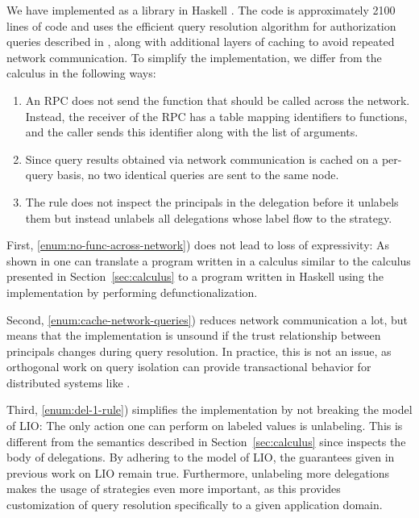 We have implemented \lang{} as a library in Haskell \cite{flamiolib}. The code is approximately 2100 lines of code and uses the efficient query resolution algorithm for authorization queries described in \cite{Arden:2015:FA:2859845.2859998}, along with additional layers of caching to avoid repeated network communication. To simplify the implementation, we differ from the calculus in the following ways:
\begin{enumerate}
    \item \label{enum:no-func-across-network} An RPC does not send the function that should be called across the network. Instead, the receiver of the RPC has a table mapping identifiers to functions, and the caller sends this identifier along with the list of arguments.
    \item \label{enum:cache-network-queries} Since query results obtained via network communication is cached on a per-query basis, no two identical queries are sent to the same node.
    \item \label{enum:del-1-rule} The  rule does not inspect the principals in the delegation before it unlabels them but instead unlabels all delegations whose label flow to the strategy.
\end{enumerate}

First, \ref{enum:no-func-across-network}) does not lead to loss of expressivity: As shown in \cite{Cooper:2009:RC:1599410.1599439} one can translate a program written in a calculus similar to the calculus presented in Section~\ref{sec:calculus} to a program written in Haskell using the \lang{} implementation by performing defunctionalization.

Second, \ref{enum:cache-network-queries}) reduces network communication a lot, but means that the implementation is unsound if the trust relationship between principals changes during query resolution. In practice, this is not an issue, as orthogonal work on query isolation \cite{Liu:2009:FPS:1629575.1629606} can provide transactional behavior for distributed systems like \lang.

Third, \ref{enum:del-1-rule}) simplifies the implementation by not breaking the model of LIO: The only action one can perform on labeled values is unlabeling. This is different from the semantics described in Section~\ref{sec:calculus} since  inspects the body of delegations. By adhering to the model of LIO, the guarantees given in previous work on LIO \cite{SRMMlio} remain true. Furthermore, unlabeling more delegations makes the usage of strategies even more important, as this provides customization of query resolution specifically to a given application domain.

